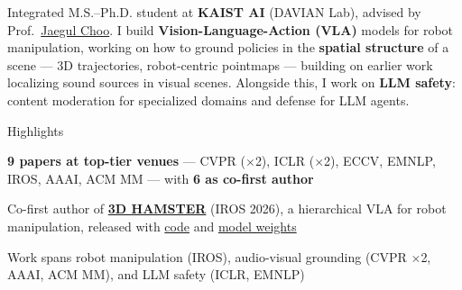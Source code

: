 
\begin{cvparagraph}
Integrated M.S.--Ph.D. student at \textbf{KAIST AI} (DAVIAN Lab), advised by Prof.\ \href{https://sites.google.com/site/jaegulchoo/}{Jaegul Choo}.
I build \textbf{Vision-Language-Action (VLA)} models for robot manipulation, working on how to ground policies in the \textbf{spatial structure} of a scene --- 3D trajectories, robot-centric pointmaps --- building on earlier work localizing sound sources in visual scenes.
Alongside this, I work on \textbf{LLM safety}: content moderation for specialized domains and defense for LLM agents.
\end{cvparagraph}

\cventry
  {}
  {Highlights\vspace{-0.3cm}}
  {}
  {}
  {%
    \begin{cvitems}
      \item \textbf{9 papers at top-tier venues} --- CVPR ($\times$2), ICLR ($\times$2), ECCV, EMNLP, IROS, AAAI, ACM MM --- with \textbf{6 as co-first author}
      \item Co-first author of \href{https://davian-robotics.github.io/3D_HAMSTER/}{\textbf{3D HAMSTER}} (IROS 2026), a hierarchical VLA for robot manipulation, released with \href{https://github.com/DAVIAN-Robotics/3D_HAMSTER}{code} and \href{https://huggingface.co/DAVIAN-Robotics/3D_HAMSTER}{model weights}
      \item Work spans robot manipulation (IROS), audio-visual grounding (CVPR $\times$2, AAAI, ACM MM), and LLM safety (ICLR, EMNLP)
    \end{cvitems}
  }
